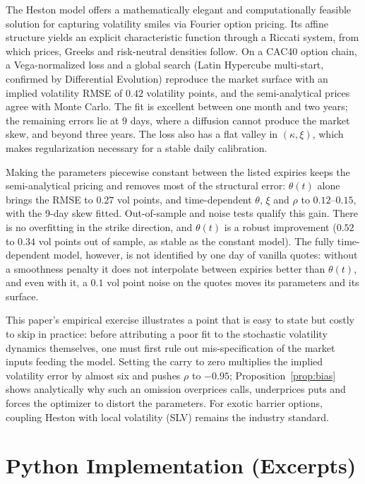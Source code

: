 \documentclass[11pt,a4paper]{article}
\theoremstyle{plain}
\theoremstyle{definition}
\begin{document}
The Heston model offers a mathematically elegant and computationally feasible solution for capturing volatility smiles via Fourier option pricing. Its affine structure yields an explicit characteristic function through a Riccati system, from which prices, Greeks and risk-neutral densities follow. On a CAC40 option chain, a Vega-normalized loss and a global search (Latin Hypercube multi-start, confirmed by Differential Evolution) reproduce the market surface with an implied volatility RMSE of $0.42$ volatility points, and the semi-analytical prices agree with Monte Carlo. The fit is excellent between one month and two years; the remaining errors lie at 9 days, where a diffusion cannot produce the market skew, and beyond three years. The loss also has a flat valley in $(\kappa,\xi)$, which makes regularization necessary for a stable daily calibration.

Making the parameters piecewise constant between the listed expiries keeps the semi-analytical pricing and removes most of the structural error: $\theta(t)$ alone brings the RMSE to $0.27$ vol points, and time-dependent $\theta$, $\xi$ and $\rho$ to $0.12$--$0.15$, with the 9-day skew fitted. Out-of-sample and noise tests qualify this gain. There is no overfitting in the strike direction, and $\theta(t)$ is a robust improvement ($0.52$ to $0.34$ vol points out of sample, as stable as the constant model). The fully time-dependent model, however, is not identified by one day of vanilla quotes: without a smoothness penalty it does not interpolate between expiries better than $\theta(t)$, and even with it, a $0.1$ vol point noise on the quotes moves its parameters and its surface.

This paper's empirical exercise illustrates a point that is easy to state but costly to skip in practice: before attributing a poor fit to the stochastic volatility dynamics themselves, one must first rule out mis-specification of the market inputs feeding the model. Setting the carry to zero multiplies the implied volatility error by almost six and pushes $\rho$ to $-0.95$; Proposition~\ref{prop:bias} shows analytically why such an omission overprices calls, underprices puts and forces the optimizer to distort the parameters. For exotic barrier options, coupling Heston with local volatility (SLV) remains the industry standard.

\clearpage

\appendix
\section{Python Implementation (Excerpts)}
\label{app:code}
\end{document}
